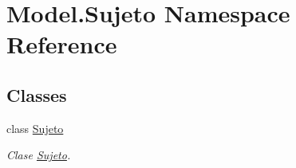 \hypertarget{namespace_model_1_1_sujeto}{}\section{Model.\+Sujeto Namespace Reference}
\label{namespace_model_1_1_sujeto}
\subsection*{Classes}
\begin{DoxyCompactItemize}
\item 
class \hyperlink{class_model_1_1_sujeto_1_1_sujeto}{Sujeto}
\begin{DoxyCompactList}\small\item\em Clase \hyperlink{class_model_1_1_sujeto_1_1_sujeto}{Sujeto}. \end{DoxyCompactList}\end{DoxyCompactItemize}
